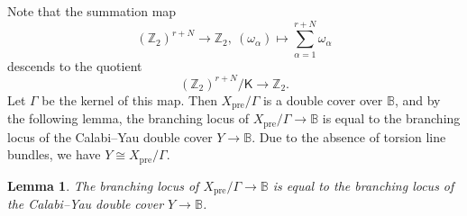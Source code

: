 \documentclass[12pt,a4paper,oneside]{amsart}
\numberwithin{equation}{section}
\newtheorem{lem}[thm]{Lemma}
\theoremstyle{definition}
\theoremstyle{remark}
\newcommand{\Xpre}{X_{\mathrm{pre}}}
\begin{document}
Note that the summation map 
\begin{equation*}
    (\mathbb{Z}_{2})^{r+N}\to \mathbb{Z}_{2},~(\omega_{\alpha})\mapsto 
    \sum_{\alpha=1}^{r+N} \omega_{\alpha}
\end{equation*}
descends to the quotient
\begin{equation*}
    (\mathbb{Z}_{2})^{r+N}\slash \mathsf{K}\to \mathbb{Z}_{2}.
\end{equation*}
Let \(\Gamma\) be the kernel of this map. Then \(\Xpre\slash \Gamma\)
is a double cover over \(\mathbb{B}\), and
by the following lemma, the branching locus of
\(\Xpre\slash\Gamma\to \mathbb{B}\) is
equal to the branching locus of the Calabi--Yau double cover
\(Y\to \mathbb{B}\). Due to the absence of torsion
line bundles, we have \(Y\cong \Xpre\slash\Gamma\).
\begin{lem}
    The branching locus of \(\Xpre\slash\Gamma\to \mathbb{B}\)
    is equal to the branching locus of the Calabi--Yau double cover
    \(Y\to \mathbb{B}\).
\end{lem}
\end{document}
